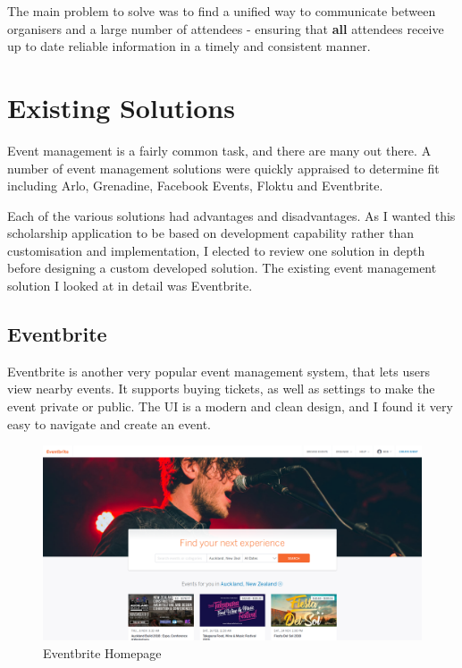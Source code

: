 \documentclass[a4paper,oneside,12pt]{report}
\begin{document}
    The main problem to solve was to find a unified way to communicate between organisers and a large number of attendees - ensuring that \textbf{all} attendees receive up to date reliable information in a timely and consistent manner.

	\section{Existing Solutions}
	Event management is a fairly common task, and there are many out there. A number of event management solutions were quickly appraised to determine fit including Arlo, Grenadine, Facebook Events, Floktu and Eventbrite. 
	
	Each of the various solutions had advantages and disadvantages. As I wanted this scholarship application to be based on development capability rather than customisation and implementation, I elected to review one solution in depth before designing a custom developed solution. The existing event management solution I looked at in detail was Eventbrite.

	\subsection{Eventbrite}
	Eventbrite is another very popular event management system, that lets users view nearby events.
	It supports buying tickets, as well as settings to make the event private or public. The UI is a modern and clean design, and I found it very easy to navigate and create an event.

	\begin{figure}[H]
		\caption{Eventbrite Homepage}
		\includegraphics[width=\linewidth]{static/eventbrite-home.png}
	\end{figure}
\end{document}
